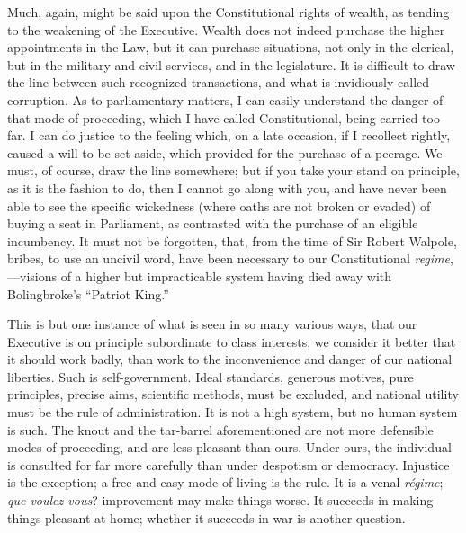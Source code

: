 Much, again, might be said upon the
Constitutional rights of wealth, as tending to the weakening of the
Executive. Wealth does not indeed purchase the higher appointments in
the Law, but it can purchase situations, not only in the clerical, but
in the military and civil services, and in the legislature. It is
difficult to draw the line between such recognized transactions, and
what is invidiously called corruption. As to parliamentary matters, I
can easily understand the danger of that mode of proceeding, which I
have called Constitutional, being carried too far. I can do justice to
the feeling which, on a late occasion, if I recollect rightly, caused
a will to be set aside, which provided for the purchase of a peerage.
We must, of course, draw the line somewhere; but if you take your
stand on principle, as it is the fashion to do, then I cannot go along
with you, and have never been able to see the specific wickedness
(where oaths are not broken or evaded) of buying a seat in Parliament,
as contrasted with the purchase of an eligible incumbency. It must not
be forgotten, that, from the time of Sir Robert Walpole, bribes,
to use an uncivil word, have been necessary to our Constitutional \emph{regime},—visions of a higher but impracticable system having died
away with Bolingbroke's ``Patriot King.''

This is but one instance of what is seen in so
many various ways, that our Executive is on principle subordinate to
class interests; we consider it better that it should work badly, than
work to the inconvenience and danger of our national liberties. Such
is self-government. Ideal standards, generous motives, pure
principles, precise aims, scientific methods, must be excluded, and
national utility must be the rule of administration. It is not a high
system, but no human system is such. The knout and the tar-barrel
aforementioned are not more defensible modes of proceeding, and are
less pleasant than ours. Under ours, the individual is consulted for
far more carefully than under despotism or democracy. Injustice is the
exception; a free and easy mode of living is the rule. It is a venal \emph{régime};
\emph{que voulez-vous}? improvement may make things worse. It succeeds
in making things pleasant at home; whether it succeeds in war is
another question.


